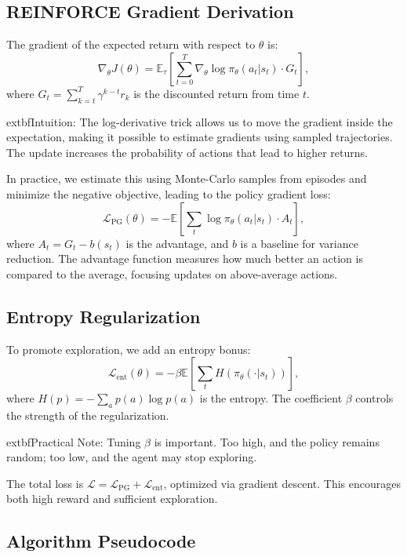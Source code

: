 \documentclass[conference]{IEEEtran}
\begin{document}
\subsection{REINFORCE Gradient Derivation}


The gradient of the expected return with respect to $\theta$ is:
\[
\nabla_\theta J(\theta) = \mathbb{E}_{\tau} \left[ \sum_{t=0}^T \nabla_\theta \log \pi_\theta(a_t | s_t) \cdot G_t \right],
\]
where $G_t = \sum_{k=t}^T \gamma^{k-t} r_k$ is the discounted return from time $t$.

	extbf{Intuition:} The log-derivative trick allows us to move the gradient inside the expectation, making it possible to estimate gradients using sampled trajectories. The update increases the probability of actions that lead to higher returns.

In practice, we estimate this using Monte-Carlo samples from episodes and minimize the negative objective, leading to the policy gradient loss:
\[
\mathcal{L}_\text{PG}(\theta) = -\mathbb{E} \left[ \sum_{t} \log \pi_\theta(a_t | s_t) \cdot A_t \right],
\]
where $A_t = G_t - b(s_t)$ is the advantage, and $b$ is a baseline for variance reduction. The advantage function measures how much better an action is compared to the average, focusing updates on above-average actions.

\subsection{Entropy Regularization}


To promote exploration, we add an entropy bonus:
\[
\mathcal{L}_\text{ent}(\theta) = -\beta \mathbb{E} \left[ \sum_{t} H(\pi_\theta(\cdot | s_t)) \right],
\]
where $H(p) = -\sum_a p(a) \log p(a)$ is the entropy. The coefficient $\beta$ controls the strength of the regularization.

	extbf{Practical Note:} Tuning $\beta$ is important. Too high, and the policy remains random; too low, and the agent may stop exploring.

The total loss is $\mathcal{L} = \mathcal{L}_\text{PG} + \mathcal{L}_\text{ent}$, optimized via gradient descent. This encourages both high reward and sufficient exploration.

\subsection{Algorithm Pseudocode}
\end{document}

